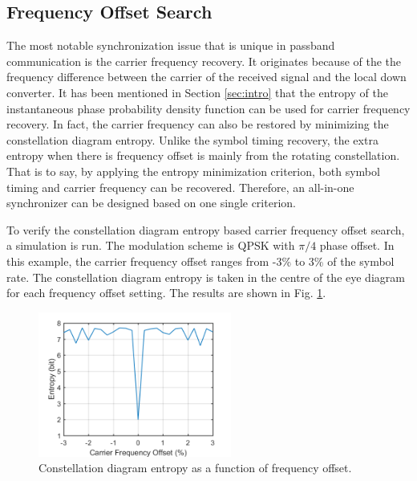\documentclass[journal,comsoc]{IEEEtran}
\begin{document}
\subsection{Frequency Offset Search}
The most notable synchronization issue that is unique in passband communication is the carrier frequency recovery.
It originates because of the the frequency difference between the carrier of the received signal and the local down converter.
It has been mentioned in Section \ref{sec:intro} that the entropy of the instantaneous phase probability density function can be used for carrier frequency recovery.
In fact, the carrier frequency can also be restored by minimizing the constellation diagram entropy. 
Unlike the symbol timing recovery, the extra entropy when there is frequency offset is mainly from the rotating constellation.
That is to say, by applying the entropy minimization criterion, both symbol timing and carrier frequency can be recovered.
Therefore, an all-in-one synchronizer can be designed based on one single criterion.




To verify the constellation diagram entropy based carrier frequency offset search, a simulation is run.
The modulation scheme is QPSK with \(\pi/4\) phase offset.
In this example, the carrier frequency offset ranges from -3\% to 3\% of the symbol rate.
The constellation diagram entropy is taken in the centre of the eye diagram for each frequency offset setting.
The results are shown in Fig. \ref{fig:carrier_entropy}.

\begin{figure}[htbp]
\centering
\includegraphics[width=2.5in]{carrier_entropy.png}
\caption{Constellation diagram entropy as a function of frequency offset.}
\label{fig:carrier_entropy} 
\end{figure}
\end{document}
